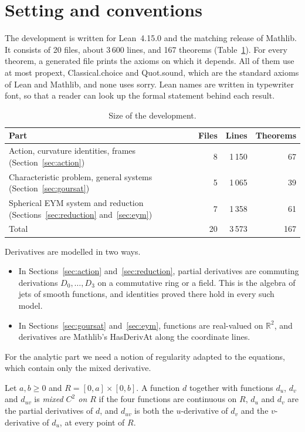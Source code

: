 \documentclass{lmcs}
\DeclareRobustCommand{\lean}[1]{{\ttfamily\def\_{\textunderscore\allowbreak}#1}}
\newcommand{\R}{\mathbb{R}}
\begin{document}
\section{Setting and conventions}\label{sec:setting}

The development is written for Lean~4.15.0 and the matching release of Mathlib. It consists of 20 files, about 3\,600 lines, and 167 theorems (Table~\ref{tab:size}). For every theorem, a generated file prints the axioms on which it depends. All of them use at most \lean{propext}, \lean{Classical.choice} and \lean{Quot.sound}, which are the standard axioms of Lean and Mathlib, and none uses \lean{sorry}. Lean names are written in typewriter font, so that a reader can look up the formal statement behind each result.

\begin{table}[h]
\centering
\begin{tabular}{@{}lrrr@{}}
\toprule
Part & Files & Lines & Theorems\\
\midrule
Action, curvature identities, frames (Section~\ref{sec:action}) & 8 & 1\,150 & 67\\
Characteristic problem, general systems (Section~\ref{sec:goursat}) & 5 & 1\,065 & 39\\
Spherical EYM system and reduction (Sections~\ref{sec:reduction} and~\ref{sec:eym}) & 7 & 1\,358 & 61\\
\midrule
Total & 20 & 3\,573 & 167\\
\bottomrule
\end{tabular}
\caption{Size of the development.}\label{tab:size}
\end{table}

Derivatives are modelled in two ways.
\begin{itemize}
\item In Sections~\ref{sec:action} and~\ref{sec:reduction}, partial derivatives are commuting derivations $D_0,\dots,D_3$ on a commutative ring or a field. This is the algebra of jets of smooth functions, and identities proved there hold in every such model.
\item In Sections~\ref{sec:goursat} and~\ref{sec:eym}, functions are real-valued on $\R^2$, and derivatives are Mathlib's \lean{HasDerivAt} along the coordinate lines.
\end{itemize}

For the analytic part we need a notion of regularity adapted to the equations, which contain only the mixed derivative.

\begin{defi}[\lean{C2Data}]\label{def:c2}
Let $a,b\ge0$ and $R=[0,a]\times[0,b]$. A function $d$ together with functions $d_u$, $d_v$ and $d_{uv}$ is \emph{mixed $C^2$ on $R$} if the four functions are continuous on $R$, $d_u$ and $d_v$ are the partial derivatives of $d$, and $d_{uv}$ is both the $u$-derivative of $d_v$ and the $v$-derivative of $d_u$, at every point of $R$.
\end{defi}
\end{document}

